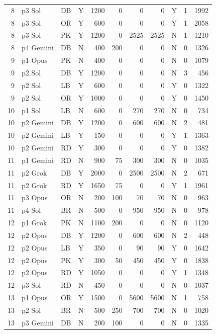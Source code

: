\begin{longtable}{r l l l r r r r l r r}
8 & p3 Sol & DB & Y & 1200 & 0 & 0 & 0 & Y & 1 & 1992 \\
8 & p3 Sol & OR & Y & 600 & 0 & 0 & 0 & Y & 1 & 2058 \\
8 & p3 Sol & PK & Y & 1200 & 0 & 2525 & 2525 & N & 1 & 1210 \\
8 & p4 Gemini & DB & N & 400 & 200 & 0 & 0 & N & 0 & 1326 \\
9 & p1 Opus & PK & N & 400 & 0 & 0 & 0 & N & 0 & 1079 \\
9 & p2 Sol & DB & Y & 1200 & 0 & 0 & 0 & N & 3 & 456 \\
9 & p2 Sol & LB & Y & 600 & 0 & 0 & 0 & Y & 0 & 1322 \\
9 & p2 Sol & OR & Y & 1000 & 0 & 0 & 0 & Y & 0 & 1450 \\
10 & p1 Sol & LB & N & 600 & 0 & 270 & 270 & N & 0 & 734 \\
10 & p2 Gemini & DB & Y & 1200 & 0 & 600 & 600 & N & 2 & 481 \\
10 & p2 Gemini & LB & Y & 150 & 0 & 0 & 0 & Y & 1 & 1363 \\
10 & p2 Gemini & RD & Y & 300 & 0 & 0 & 0 & Y & 0 & 1382 \\
11 & p1 Gemini & RD & N & 900 & 75 & 300 & 300 & N & 0 & 1035 \\
11 & p2 Grok & DB & Y & 2000 & 0 & 2500 & 2500 & N & 2 & 671 \\
11 & p2 Grok & RD & Y & 1650 & 75 & 0 & 0 & Y & 1 & 1961 \\
11 & p3 Opus & OR & N & 200 & 100 & 70 & 70 & N & 0 & 963 \\
11 & p4 Sol & BR & N & 500 & 0 & 950 & 950 & N & 0 & 978 \\
12 & p1 Grok & PK & N & 1100 & 200 & 0 & 0 & N & 0 & 1120 \\
12 & p2 Opus & DB & Y & 1200 & 0 & 600 & 600 & N & 2 & 448 \\
12 & p2 Opus & LB & Y & 350 & 0 & 90 & 90 & Y & 0 & 1642 \\
12 & p2 Opus & PK & Y & 300 & 50 & 450 & 450 & Y & 0 & 1838 \\
12 & p2 Opus & RD & Y & 1050 & 0 & 0 & 0 & Y & 1 & 1348 \\
12 & p3 Sol & RD & N & 450 & 0 & 0 & 0 & N & 0 & 1037 \\
13 & p1 Opus & OR & Y & 1500 & 0 & 5600 & 5600 & N & 1 & 758 \\
13 & p2 Sol & BR & N & 500 & 250 & 700 & 700 & N & 0 & 1020 \\
13 & p3 Gemini & DB & N & 200 & 100 & 0 & 0 & N & 0 & 1335 \\

\end{longtable}
